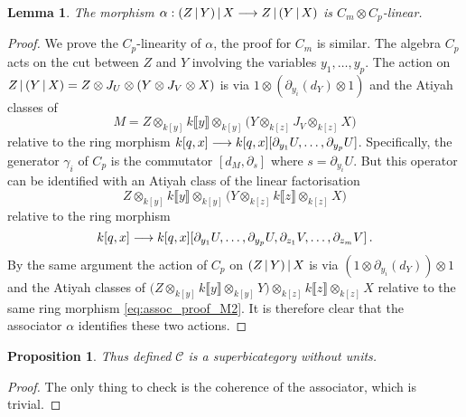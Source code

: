 \documentclass[english,letter paper,12pt,leqno]{article}
\newtheorem{proposition}[theorem]{Proposition}
\newtheorem{lemma}[theorem]{Lemma}
\theoremstyle{example}
\numberwithin{equation}{section}
\def\L{\mathcal{C}}
\def\ferm{\gamma}
\begin{document}
\begin{lemma}\label{lemma:associator} The morphism $\alpha: (Z \,|\, Y) \,|\, X \longrightarrow Z \,|\, (Y \,|\, X)$ is $C_m \otimes C_p$-linear.
\end{lemma}
\begin{proof}
We prove the $C_p$-linearity of $\alpha$, the proof for $C_m$ is similar. The algebra $C_p$ acts on the cut between $Z$ and $Y$ involving the variables $y_1,\ldots,y_p$. The action on $Z \,|\, ( Y \,|\, X ) = Z \otimes J_U \otimes (Y \otimes J_V \otimes X)$ is via $1 \otimes (\partial_{y_i}(d_Y) \otimes 1)$ and the Atiyah classes of 
\[
M = Z \otimes_{k[y]} k\llbracket y \rrbracket \otimes_{k[y]} \big( Y \otimes_{k[z]} J_V \otimes_{k[z]} X \big)
\]
relative to the ring morphism $k[q,x] \longrightarrow k[q,x] [ \partial_{y_1} U, \ldots, \partial_{y_p} U ]$. Specifically, the generator $\ferm_i$ of $C_p$ is the commutator $[d_{M}, \partial_s]$ where $s = \partial_{y_i} U$. But this operator can be identified with an Atiyah class of the linear factorisation
\begin{equation}\label{eq:assoc_proof_M}
Z \otimes_{k[y]} k\llbracket y \rrbracket \otimes_{k[y]} \big( Y \otimes_{k[z]} k\llbracket z \rrbracket \otimes_{k[z]} X \big)
\end{equation}
relative to the ring morphism
\begin{equation}\label{eq:assoc_proof_M2}
k[q,x] \longrightarrow k[q,x] [ \partial_{y_1} U, \ldots, \partial_{y_p} U, \partial_{z_1} V, \ldots, \partial_{z_m} V ]\,.
\end{equation}
By the same argument the action of $C_p$ on $(Z \,|\, Y ) \,|\, X$ is via $(1 \otimes \partial_{y_i}(d_Y)) \otimes 1$ and the Atiyah classes of $\big( Z \otimes_{k[y]} k\llbracket y \rrbracket \otimes_{k[y]} Y \big) \otimes_{k[z]} k\llbracket z \rrbracket \otimes_{k[z]} X$ relative to the same ring morphism \eqref{eq:assoc_proof_M2}. It is therefore clear that the associator $\alpha$ identifies these two actions.
\end{proof}

\begin{proposition} Thus defined $\L$ is a superbicategory without units.
\end{proposition}
\begin{proof}
The only thing to check is the coherence of the associator, which is trivial.
\end{proof}
\end{document}
